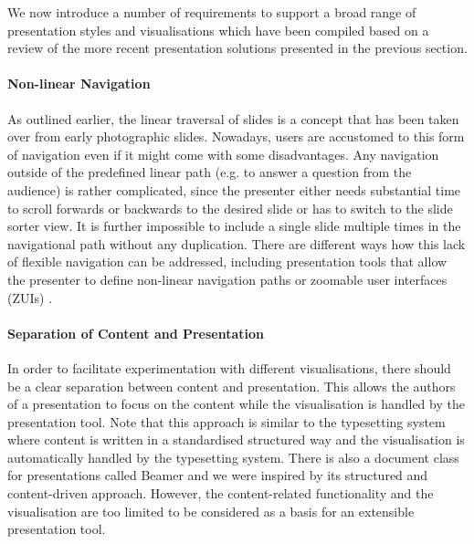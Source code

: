 \documentclass[a4paper,12pt]{report}
\begin{document}
    We now introduce a number of requirements to support a broad range of
    presentation styles and visualisations which have been compiled based on a
    review of the more recent presentation solutions presented in the previous
    section.

     \paragraph{Non-linear Navigation} As outlined earlier, the linear
      traversal of slides is a concept that has been taken over from early
      photographic slides. Nowadays, users are accustomed to this form of
      navigation even if it might come with some disadvantages. Any navigation
      outside of the predefined linear path (e.g. to answer a question from the
      audience) is rather complicated, since the presenter either needs
      substantial time to scroll forwards or backwards to the desired slide or
      has to switch to the slide sorter view. It is further impossible to
      include a single slide multiple times in the navigational path without
      any duplication. There are different ways how this lack of flexible
      navigation can be addressed, including presentation tools that allow the
      presenter to define non-linear navigation paths \citep{spicer-1}
      \citep{edge-1} or zoomable user interfaces (ZUIs) \citep{good-1}
      \citep{lichtschlag-1} \citep{haller-1}.

     \paragraph{Separation of Content and Presentation} In order to facilitate
      experimentation with different visualisations, there should be a clear
      separation between content and presentation. This allows the authors of a
      presentation to focus on the content while the visualisation is handled
      by the presentation tool. Note that this approach is similar to the
      \latex typesetting system where content is written in a standardised
      structured way and the visualisation is automatically handled by the
      typesetting system. There is also a \latex document class for
      presentations called Beamer and we were inspired by its structured and
      content-driven approach. However, the content-related functionality and
      the visualisation are too limited to be considered as a basis for an
      extensible presentation tool.
\end{document}
